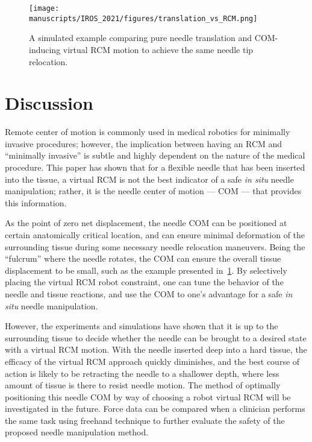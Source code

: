 \begin{figure}[tb]
  \centering
  \texttt{[image: manuscripts/IROS\_2021/figures/translation\_vs\_RCM.png]}
  \caption{A simulated example comparing pure needle translation and COM-inducing virtual RCM motion to achieve the same needle tip relocation.}
  \label{fig:trans_vs_com}
\end{figure}

\section{Discussion} 
\label{sec:chap-2-discussion-and-conclusion}
Remote center of motion is commonly used in medical robotics for minimally invasive procedures; however, the implication between having an RCM and ``minimally invasive'' is subtle and highly dependent on the nature of the medical procedure. This paper has shown that for a flexible needle that has been inserted into the tissue, a virtual RCM is not the best indicator of a safe \textit{in situ} needle manipulation; rather, it is the needle center of motion --- COM --- that provides this information. 

As the point of zero net displacement, the needle COM can be positioned at certain anatomically critical location, and can ensure minimal deformation of the surrounding tissue during some necessary needle relocation maneuvers. Being the ``fulcrum'' where the needle rotates, the COM can ensure the overall tissue displacement to be small, such as the example presented in~\cref{fig:trans_vs_com}. By selectively placing the virtual RCM robot constraint, one can tune the behavior of the needle and tissue reactions, and use the COM to one's advantage for a safe \textit{in situ} needle manipulation.

However, the experiments and simulations have shown that it is up to the surrounding tissue to decide whether the needle can be brought to a desired state with a virtual RCM motion. With the needle inserted deep into a hard tissue, the efficacy of the virtual RCM approach quickly diminishes, and the best course of action is likely to be retracting the needle to a shallower depth, where less amount of tissue is there to resist needle motion. The method of optimally positioning this needle COM by way of choosing a robot virtual RCM will be investigated in the future. Force data can be compared when a clinician performs the same task using freehand technique to further evaluate the safety of the proposed needle manipulation method.

